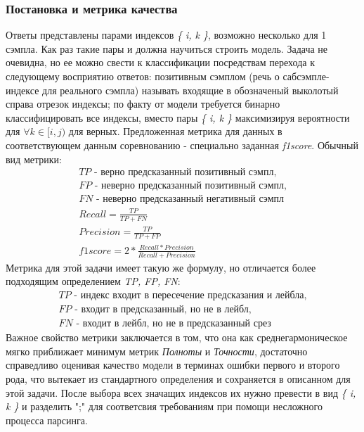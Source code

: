 \subsubsection{Постановка и метрика качества}
Ответы представлены парами индексов \textit{\{ i, k \}}, возможно несколько для 1 сэмпла. Как раз такие пары и должна научиться строить модель.
Задача не очевидна, но ее можно свести к классификации посредствам перехода к следующему восприятию ответов:
позитивным сэмплом (речь о сабсэмпле-индексе для реального сэмпла) называть входящие в обозначеный выколотый справа отрезок индексы; по факту от модели требуется бинарно классифицировать все индексы, вместо пары \textit{\{ i, k \}} максимизируя вероятности для $\forall k \in [i,j)$ для верных.
\newline
Предложенная метрика для данных в соответствующем данным соревнованию - специально заданная \textit{f1score}. Обычный вид метрики:
\begin{gather*}
    \textit{TP - верно предсказанный позитивный сэмпл,}\\ 
    \textit{FP - неверно предсказанный позитивный сэмпл,}\\
    \textit{FN - неверно предсказанный негативный сэмпл}\\
    \nonumber Recall = \frac{TP}{TP+FN}\\
    \nonumber Precision = \frac{TP}{TP+FP}\\
    f1score = 2*\frac{Recall*Precision}{Recall+Precision}
\end{gather*}
Метрика для этой задачи имеет такую же формулу, но отличается более подходящим определением \textit{TP, FP, FN}:
\begin{gather*}
    \textit{TP - индекс входит в пересечение предсказания и лейбла,}\\
    \textit{FP - входит в предсказанный, но не в лейбл,}\\
    \textit{FN - входит в лейбл, но не в предсказанный срез}
\end{gather*}
Важное свойство метрики заключается в том, что она как среднегармоническое мягко приближает минимум метрик \textit{Полноты} и \textit{Точности}, достаточно справедливо оценивая качество модели в терминах ошибки первого и второго рода, что вытекает из стандартного определения и сохраняется в описанном для этой задачи. 
\newline
После выбора всех значащих индексов их нужно превести в вид \textit{\{ i, k \}} и разделить ";" для соответсвия требованиям при помощи несложного процесса парсинга.
